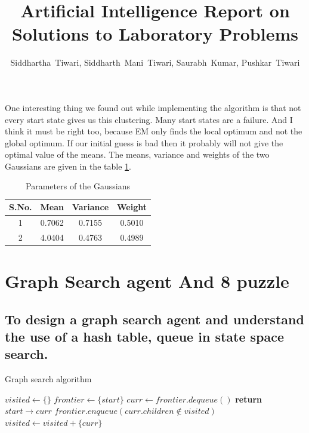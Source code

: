 \documentclass[journal, compsoc]{IEEEtran}
\begin{document}
One interesting thing we found out while implementing the algorithm is that not every start state gives us this clustering. Many start states are a failure.
And I think it must be right too, because EM only finds the local optimum and not the global optimum. If our initial guess is bad then it probably will not
give the optimal value of the means. The means, variance and weights of the two Gaussians are given in the table \ref{table:parameters}.

\begin{table}[!h]
\renewcommand{\arraystretch}{0.4}
\caption{Parameters of the Gaussians}
\label{table:parameters}
\centering
\begin{tabular}{|c|c|c|c|}
\hline
{\bfseries S.No.} & {\bfseries Mean} & {\bfseries Variance} & {\bfseries Weight}\\
\hline \hline
1 & 0.7062 & 0.7155 & 0.5010\\
\hline
2 & 4.0404 & 0.4763 & 0.4989\\
\hline
\end{tabular}
\end{table}

\title{Artificial Intelligence Report on Solutions to Laboratory Problems}

\author{Siddhartha~Tiwari, Siddharth~Mani~Tiwari, Saurabh~Kumar, Pushkar~Tiwari}


\section{Graph Search agent And 8 puzzle}
\subsection{To design a graph search agent and understand the use of a hash table, queue
in state space search.}

\begin{algorithm}
\caption{ Graph search algorithm}
\begin{algorithmic}
\State $visited \gets \{\}$
\State $frontier \gets \{start\}$ 
\State $curr \gets frontier.dequeue()$
\State \textbf{return} $start \rightarrow curr$
\EndIf
\State $frontier.enqueue(curr.children \notin visited)$
\State $visited \gets visited + \{curr\}$
\EndWhile\label{bfsendwhile}
\EndProcedure
\end{algorithmic}
\end{algorithm}
\end{document}
